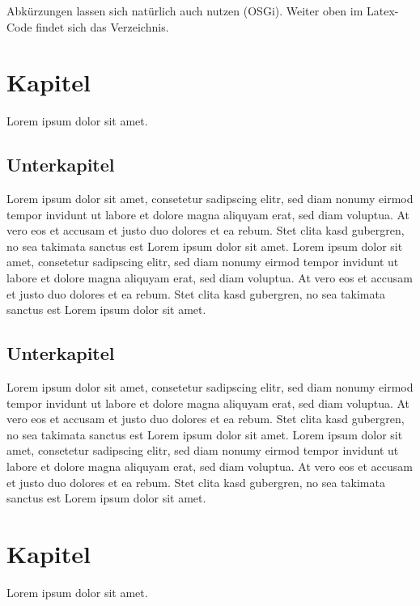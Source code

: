 \documentclass[12pt,a4paper,bibliography=totocnumbered,listof=totocnumbered]{scrartcl}
\begin{document}
Abkürzungen lassen sich natürlich auch nutzen (\ac{OSGi}). Weiter oben im Latex-Code findet sich das Verzeichnis.
\pagebreak

\section{Kapitel}
Lorem ipsum dolor sit amet.

\subsection{Unterkapitel}
Lorem ipsum dolor sit amet, consetetur sadipscing elitr, sed diam nonumy eirmod tempor invidunt ut labore et dolore magna aliquyam erat, sed diam voluptua. At vero eos et accusam et justo duo dolores et ea rebum. Stet clita kasd gubergren, no sea takimata sanctus est Lorem ipsum dolor sit amet. Lorem ipsum dolor sit amet, consetetur sadipscing elitr, sed diam nonumy eirmod tempor invidunt ut labore et dolore magna aliquyam erat, sed diam voluptua. At vero eos et accusam et justo duo dolores et ea rebum. Stet clita kasd gubergren, no sea takimata sanctus est Lorem ipsum dolor sit amet.

\subsection{Unterkapitel}
Lorem ipsum dolor sit amet, consetetur sadipscing elitr, sed diam nonumy eirmod tempor invidunt ut labore et dolore magna aliquyam erat, sed diam voluptua. At vero eos et accusam et justo duo dolores et ea rebum. Stet clita kasd gubergren, no sea takimata sanctus est Lorem ipsum dolor sit amet. Lorem ipsum dolor sit amet, consetetur sadipscing elitr, sed diam nonumy eirmod tempor invidunt ut labore et dolore magna aliquyam erat, sed diam voluptua. At vero eos et accusam et justo duo dolores et ea rebum. Stet clita kasd gubergren, no sea takimata sanctus est Lorem ipsum dolor sit amet.
\pagebreak

\section{Kapitel}
Lorem ipsum dolor sit amet.
\end{document}
